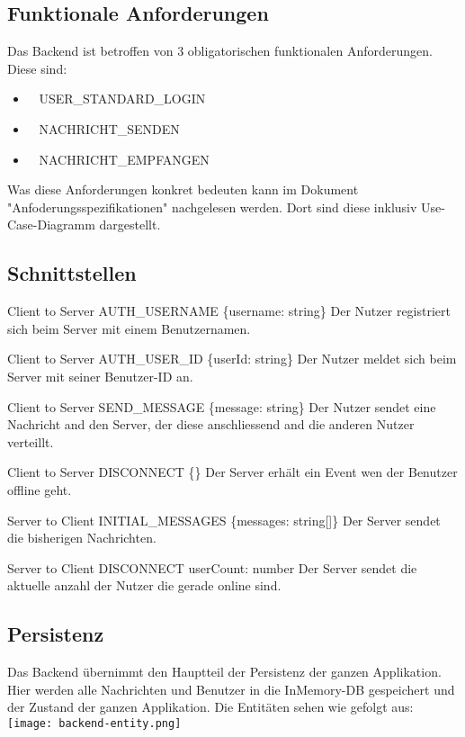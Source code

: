 	\subsection{Funktionale Anforderungen}
	Das Backend ist betroffen von 3 obligatorischen funktionalen Anforderungen. Diese sind:
	\begin{itemize}
		\item \faLock~ USER\_STANDARD\_LOGIN
		\item \faSend~ NACHRICHT\_SENDEN
		\item \faEnvelope~ NACHRICHT\_EMPFANGEN
	\end{itemize}
	Was diese Anforderungen konkret bedeuten kann im Dokument "Anfoderungsspezifikationen" nachgelesen werden. Dort sind diese inklusiv Use-Case-Diagramm dargestellt.

	\subsection{Schnittstellen}

	\apiSpecToblerone
	{Client to Server}
	{AUTH\_USERNAME}
	{\{username: string\}}
	{Der Nutzer registriert sich beim Server mit einem Benutzernamen.}

	\apiSpecToblerone
	{Client to Server}
	{AUTH\_USER\_ID}
	{\{userId: string\}}
	{Der Nutzer meldet sich beim Server mit seiner Benutzer-ID an.}

	\apiSpecToblerone
	{Client to Server}
	{SEND\_MESSAGE}
	{\{message: string\}}
	{Der Nutzer sendet eine Nachricht and den Server, der diese anschliessend and die anderen Nutzer verteillt.}

	\apiSpecToblerone
	{Client to Server}
	{DISCONNECT}
	{\{\}}
	{Der Server erhält ein Event wen der Benutzer offline geht.}

	\apiSpecToblerone
	{Server to Client}
	{INITIAL\_MESSAGES}
	{\{messages: string[]\}}
	{Der Server sendet die bisherigen Nachrichten.}

	\apiSpecToblerone
	{Server to Client}
	{DISCONNECT}
	{userCount: number}
	{Der Server sendet die aktuelle anzahl der Nutzer die gerade online sind.}

	\subsection{Persistenz}
	Das Backend übernimmt den Hauptteil der Persistenz der ganzen Applikation. Hier werden alle Nachrichten und Benutzer in die InMemory-DB gespeichert und der Zustand der ganzen Applikation.
	Die Entitäten sehen wie gefolgt aus:\newline
	\noindent
	\texttt{[image: backend-entity.png]}

